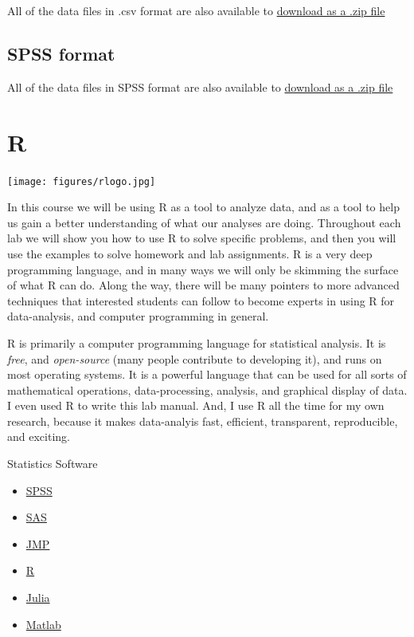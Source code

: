 \documentclass[]{book}
\providecommand{\tightlist}{%
  \setlength{\itemsep}{0pt}\setlength{\parskip}{0pt}}
\begin{document}
All of the data files in .csv format are also available to
\href{https://raw.githubusercontent.com/CrumpLab/statisticsLab/master/data/data_csv.zip}{download
as a .zip file}

\subsection{SPSS format}\label{spss-format}

All of the data files in SPSS format are also available to
\href{https://raw.githubusercontent.com/CrumpLab/statisticsLab/master/data/spssdata/spss_data.zip}{download
as a .zip file}

\section{R}\label{r}

\texttt{[image: figures/rlogo.jpg]}

In this course we will be using R as a tool to analyze data, and as a
tool to help us gain a better understanding of what our analyses are
doing. Throughout each lab we will show you how to use R to solve
specific problems, and then you will use the examples to solve homework
and lab assignments. R is a very deep programming language, and in many
ways we will only be skimming the surface of what R can do. Along the
way, there will be many pointers to more advanced techniques that
interested students can follow to become experts in using R for
data-analysis, and computer programming in general.

R is primarily a computer programming language for statistical analysis.
It is \emph{free}, and \emph{open-source} (many people contribute to
developing it), and runs on most operating systems. It is a powerful
language that can be used for all sorts of mathematical operations,
data-processing, analysis, and graphical display of data. I even used R
to write this lab manual. And, I use R all the time for my own research,
because it makes data-analyis fast, efficient, transparent,
reproducible, and exciting.

Statistics Software

\begin{itemize}
\tightlist
\item
  \href{http://www-01.ibm.com/software/analytics/spss/}{SPSS}
\item
  \href{http://www.sas.com/en_us/home.html}{SAS}
\item
  \href{http://www.jmp.com}{JMP}
\item
  \href{http://www.r-project.org}{R}
\item
  \href{http://julialang.org}{Julia}
\item
  \href{http://www.mathworks.com/products/matlab/}{Matlab}
\end{itemize}
\end{document}
